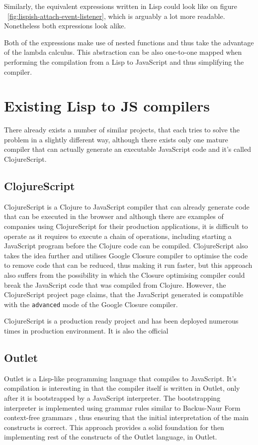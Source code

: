 

Similarly, the equivalent expressions written in Lisp could look like on figure ~\ref{fig:lispish-attach-event-listener}, which is arguably a lot more readable. Nonetheless both expressions look alike. 

Both of the expressions make use of nested functions and thus take the advantage of the lambda calculus. This abstraction can be also one-to-one mapped when performing the compilation from a Lisp to JavaScript and thus simplifying the compiler.

\section{Existing Lisp to JS compilers}\label{existing-implementations}
There already exists a number of similar projects, that each tries to solve the problem in a slightly different way, although there exists only one mature compiler that can actually generate an executable JavaScript code and it's called ClojureScript.

\subsection{ClojureScript}
ClojureScript\cite{ClojureScript:2013:Site} is a Clojure to JavaScript compiler that can already generate code that can be executed in the browser and although there are examples of companies using ClojureScript for their production applications, it is difficult to operate as it requires to execute a chain of operations, including starting a JavaScript program before the Clojure code can be compiled.
ClojureScript also takes the idea further and utilises Google Closure compiler to optimise the code to remove code that can be reduced, thus making it run faster, but this approach also suffers from the possibility in which the Closure optimising compiler could break the JavaScript code that was compiled from Clojure. However, the ClojureScript project page claims, that the JavaScript generated is compatible with the \texttt{advanced} mode of the Google Closure compiler.

ClojureScript is a production ready project and has been deployed numerous times in production environment. It is also the official 

\subsection{Outlet}
Outlet\cite{Outlet:2013:Site} is a Lisp-like programming language that compiles to JavaScript. 
It's compilation is interesting in that the compiler itself is written in Outlet, only after it is bootstrapped by a JavaScript interpreter.
The bootstrapping interpreter is implemented using grammar rules similar to Backus-Naur Form context-free grammars \cite{RecursiveDescentParserJS:2013:Site} , thus ensuring that the initial interpretation of the main constructs is correct. 
This approach provides a solid foundation for then implementing rest of the constructs of the Outlet language, in Outlet.

